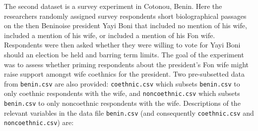 \documentclass[]{article}
\begin{document}
The second dataset is a survey experiment in Cotonou, Benin. Here the
researchers randomly assigned survey respondents short biolographical
passages on the then Beninoise president Yayi Boni that included no
mention of his wife, included a mention of his wife, or included a
mention of his Fon wife. Respondents were then asked whether they were
willing to vote for Yayi Boni should an election be held and barring
term limits. The goal of the experiment was to assess whether priming
respondents about the president's Fon wife might raise support amongst
wife coethnics for the president. Two pre-subsetted data from
\texttt{benin.csv} are also provided: \texttt{coethnic.csv} which
subsets \texttt{benin.csv} to only coethnic respondents with the wife,
and \texttt{noncoethnic.csv} which subsets \texttt{benin.csv} to only
noncoethnic respondents with the wife. Descriptions of the relevant
variables in the data file \texttt{benin.csv} (and consequently
\texttt{coethnic.csv} and \texttt{noncoethnic.csv}) are:
\end{document}
